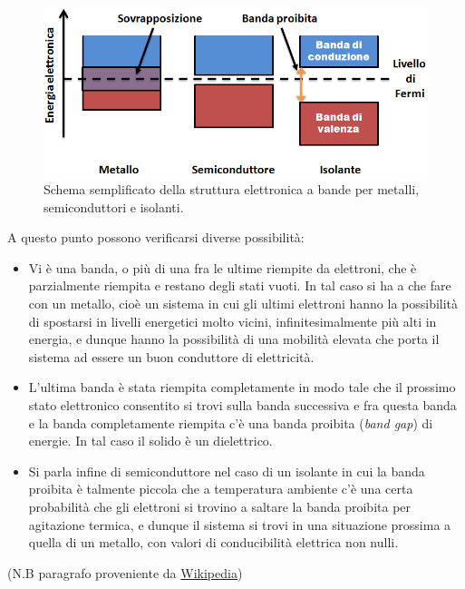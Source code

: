 \documentclass[
]{book}
\providecommand{\tightlist}{%
  \setlength{\itemsep}{0pt}\setlength{\parskip}{0pt}}
\begin{document}
\begin{figure}
\centering
\includegraphics[width=0.5\linewidth,height=\textheight,keepaspectratio]{immagini/bande.png}
\caption{Schema semplificato della struttura elettronica a bande per
metalli, semiconduttori e isolanti.}
\end{figure}

A questo punto possono verificarsi diverse possibilità:

\begin{itemize}
\tightlist
\item
  Vi è una banda, o più di una fra le ultime riempite da elettroni, che
  è parzialmente riempita e restano degli stati vuoti. In tal caso si ha
  a che fare con un metallo, cioè un sistema in cui gli ultimi elettroni
  hanno la possibilità di spostarsi in livelli energetici molto vicini,
  infinitesimalmente più alti in energia, e dunque hanno la possibilità
  di una mobilità elevata che porta il sistema ad essere un buon
  conduttore di elettricità.
\item
  L'ultima banda è stata riempita completamente in modo tale che il
  prossimo stato elettronico consentito si trovi sulla banda successiva
  e fra questa banda e la banda completamente riempita c'è una banda
  proibita (\emph{band gap}) di energie. In tal caso il solido è un
  dielettrico.
\item
  Si parla infine di semiconduttore nel caso di un isolante in cui la
  banda proibita è talmente piccola che a temperatura ambiente c'è una
  certa probabilità che gli elettroni si trovino a saltare la banda
  proibita per agitazione termica, e dunque il sistema si trovi in una
  situazione prossima a quella di un metallo, con valori di
  conducibilità elettrica non nulli.
\end{itemize}

(N.B paragrafo proveniente da
\href{https://it.wikipedia.org/wiki/Struttura_elettronica_a_bande}{Wikipedia})

\backmatter
\end{document}
